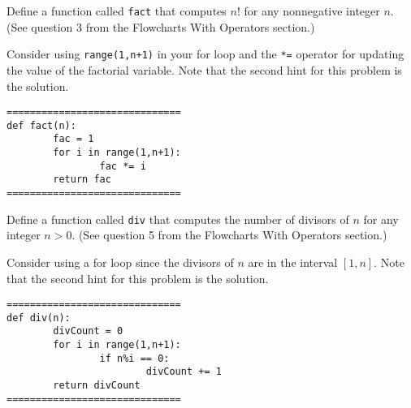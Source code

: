 \documentclass{ximera}
\begin{document}
\begin{question}
	Define a function called \verb|fact| that computes $n!$ for any nonnegative integer $n$. (See question 3 from the Flowcharts With Operators section.)
	\begin{hint}
	Consider using \verb|range(1,n+1)| in your for loop and the \verb|*=| operator for updating the value of the factorial variable. Note that the second hint for this problem is the solution.
	\end{hint}
	\begin{hint}
\begin{verbatim}
==============================
def fact(n):
        fac = 1
        for i in range(1,n+1):
                fac *= i
        return fac
==============================
\end{verbatim}
	\end{hint}
\end{question}

\begin{question}
	Define a function called \verb|div| that computes the number of divisors of $n$ for any integer $n>0$. (See question 5 from the Flowcharts With Operators section.)
	\begin{hint}
	Consider using a for loop since the divisors of $n$ are in the interval $[1,n]$. Note that the second hint for this problem is the solution.
	\end{hint}
	\begin{hint}
\begin{verbatim}
==============================
def div(n):
        divCount = 0
        for i in range(1,n+1):
                if n%i == 0:
                        divCount += 1
        return divCount
==============================
\end{verbatim}
	\end{hint}
\end{question}
\end{document}

